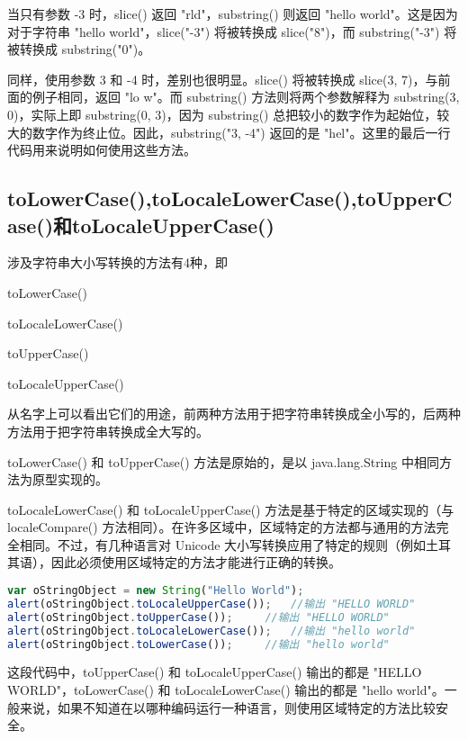 当只有参数 -3 时，slice() 返回 "rld"，substring() 则返回 "hello world"。这是因为对于字符串 "hello world"，slice("-3") 将被转换成 slice("8")，而 substring("-3") 将被转换成 substring("0")。

同样，使用参数 3 和 -4 时，差别也很明显。slice() 将被转换成 slice(3, 7)，与前面的例子相同，返回 "lo w"。而 substring() 方法则将两个参数解释为 substring(3, 0)，实际上即 substring(0, 3)，因为 substring() 总把较小的数字作为起始位，较大的数字作为终止位。因此，substring("3, -4") 返回的是 "hel"。这里的最后一行代码用来说明如何使用这些方法。

\subsection{toLowerCase(),toLocaleLowerCase(),toUpperCase()和toLocaleUpperCase()}

涉及字符串大小写转换的方法有4种，即

\begin{compactitem}
\item toLowerCase()
\item toLocaleLowerCase()
\item toUpperCase()
\item toLocaleUpperCase()
\end{compactitem}

从名字上可以看出它们的用途，前两种方法用于把字符串转换成全小写的，后两种方法用于把字符串转换成全大写的。

toLowerCase() 和 toUpperCase() 方法是原始的，是以 java.lang.String 中相同方法为原型实现的。

toLocaleLowerCase() 和 toLocaleUpperCase() 方法是基于特定的区域实现的（与 localeCompare() 方法相同）。在许多区域中，区域特定的方法都与通用的方法完全相同。不过，有几种语言对 Unicode 大小写转换应用了特定的规则（例如土耳其语），因此必须使用区域特定的方法才能进行正确的转换。


\begin{lstlisting}[language=JavaScript]
var oStringObject = new String("Hello World");
alert(oStringObject.toLocaleUpperCase());	//输出 "HELLO WORLD"
alert(oStringObject.toUpperCase());		//输出 "HELLO WORLD"
alert(oStringObject.toLocaleLowerCase());	//输出 "hello world"
alert(oStringObject.toLowerCase());		//输出 "hello world"
\end{lstlisting}

这段代码中，toUpperCase() 和 toLocaleUpperCase() 输出的都是 "HELLO WORLD"，toLowerCase() 和 toLocaleLowerCase() 输出的都是 "hello world"。一般来说，如果不知道在以哪种编码运行一种语言，则使用区域特定的方法比较安全。


